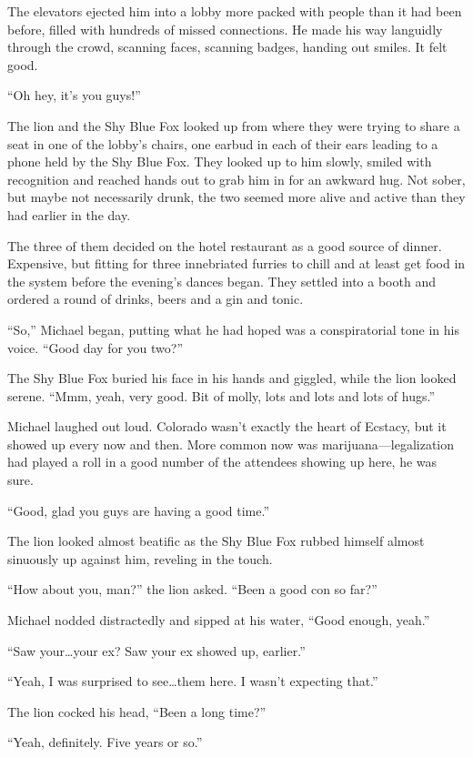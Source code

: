 The elevators ejected him into a lobby more packed with people than it had been before, filled with hundreds of missed connections. He made his way languidly through the crowd, scanning faces, scanning badges, handing out smiles. It felt good.

``Oh hey, it's you guys!''

The lion and the Shy Blue Fox looked up from where they were trying to share a seat in one of the lobby's chairs, one earbud in each of their ears leading to a phone held by the Shy Blue Fox. They looked up to him slowly, smiled with recognition and reached hands out to grab him in for an awkward hug. Not sober, but maybe not necessarily drunk, the two seemed more alive and active than they had earlier in the day.

The three of them decided on the hotel restaurant as a good source of dinner. Expensive, but fitting for three innebriated furries to chill and at least get food in the system before the evening's dances began. They settled into a booth and ordered a round of drinks, beers and a gin and tonic.

``So,'' Michael began, putting what he had hoped was a conspiratorial tone in his voice. ``Good day for you two?''

The Shy Blue Fox buried his face in his hands and giggled, while the lion looked serene. ``Mmm, yeah, very good. Bit of molly, lots and lots and lots of hugs.''

Michael laughed out loud. Colorado wasn't exactly the heart of Ecstacy, but it showed up every now and then. More common now was marijuana---legalization had played a roll in a good number of the attendees showing up here, he was sure.

``Good, glad you guys are having a good time.''

The lion looked almost beatific as the Shy Blue Fox rubbed himself almost sinuously up against him, reveling in the touch.

``How about you, man?'' the lion asked. ``Been a good con so far?''

Michael nodded distractedly and sipped at his water, ``Good enough, yeah.''

``Saw your\ldots{}your ex? Saw your ex showed up, earlier.''

``Yeah, I was surprised to see\ldots{}them here. I wasn't expecting that.''

The lion cocked his head, ``Been a long time?''

``Yeah, definitely. Five years or so.''

